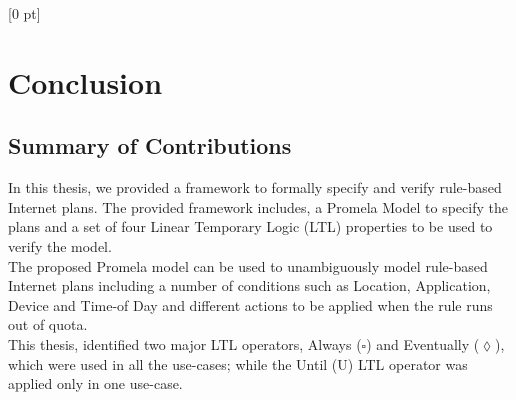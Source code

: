 \titlespacing{\chapter}{0 pt}{30 pt}{50 pt}[0 pt]
\titleformat{\section}{\Large\bfseries}{\thesection}{0 pt}{\hspace{30 pt}}
\titleformat{\subsection}{\large\bfseries}{\thesubsection}{0 pt}{\hspace{30 pt}}
\pagestyle{fancy}
\fancyhead[LO,LE]{\footnotesize\emph{\leftmark}}
\fancyhead[RO,RE]{\thepage}
\fancyfoot[CO,CE]{}

\chapter{Conclusion} %

\normalsize
\section{Summary of Contributions}
\noindent
In this thesis, we provided a framework to formally specify and verify rule-based Internet plans. The provided framework includes, a Promela Model to specify the plans and a set of four Linear Temporary Logic (LTL) properties to be used to verify the model. \\

The proposed Promela model can be used to unambiguously model rule-based Internet plans including a number of conditions such as Location, Application, Device and Time-of Day and different actions to be applied when the rule runs out of quota. \\

This thesis, identified two major LTL operators, Always ($\square$) and Eventually ($\lozenge$), which were used in all the use-cases; while the Until (U) LTL operator was applied only in one use-case.  \\

